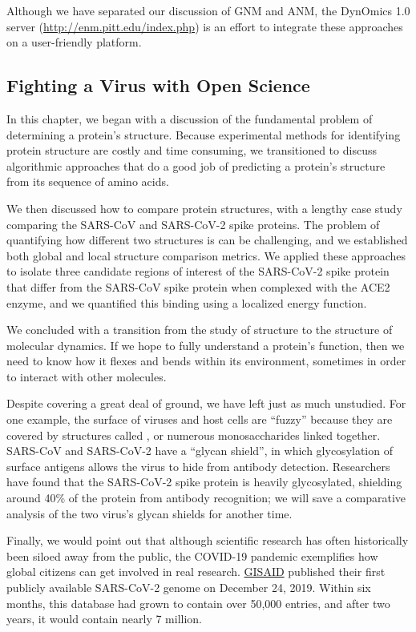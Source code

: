 Although we have separated our discussion of GNM and ANM, the DynOmics 1.0 server (\url{http://enm.pitt.edu/index.php}) is an effort to integrate these approaches on a user-friendly platform. 

\FloatBarrier
{}
\subsection{Fighting a Virus with Open Science}

In this chapter, we began with a discussion of the fundamental problem of determining a protein's structure. Because experimental methods for identifying protein structure are costly and time consuming, we transitioned to discuss algorithmic approaches that do a good job of predicting a protein's structure from its sequence of amino acids.

We then discussed how to compare protein structures, with a lengthy case study comparing the SARS-CoV and SARS-CoV-2 spike proteins. The problem of quantifying how different two structures is can be challenging, and we established both global and local structure comparison metrics. We applied these approaches to isolate three candidate regions of interest of the SARS-CoV-2 spike protein that differ from the SARS-CoV spike protein when complexed with the ACE2 enzyme, and we quantified this binding using a localized energy function.

We concluded with a transition from the study of structure to the structure of molecular dynamics. If we hope to fully understand a protein's function, then we need to know how it flexes and bends within its environment, sometimes in order to interact with other molecules.

Despite covering a great deal of ground, we have left just as much unstudied. For one example, the surface of viruses and host cells are ``fuzzy'' because they are covered by structures called , or numerous monosaccharides linked together. SARS-CoV and SARS-CoV-2 have a “glycan shield”, in which glycosylation of surface antigens allows the virus to hide from antibody detection. Researchers have found that the SARS-CoV-2 spike protein is heavily glycosylated, shielding around 40\% of the protein from antibody recognition; we will save a comparative analysis of the two virus's glycan shields for another time.

Finally, we would point out that although scientific research has often historically been siloed away from the public, the COVID-19 pandemic exemplifies how global citizens can get involved in real research. \href{https://www.gisaid.org}{GISAID} published their first publicly available SARS-CoV-2 genome on December 24, 2019. Within six months, this database had grown to contain over 50,000 entries, and after two years, it would contain nearly 7 million.

